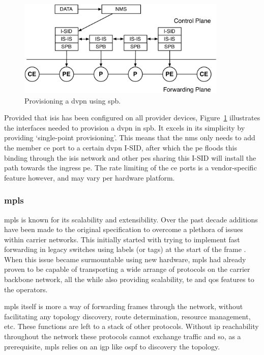 \begin{figure}[!h]
	\centering
	\includegraphics[width=10cm]{./includes/spb-stack.pdf}
	\caption{Provisioning a \ac{dvpn} using \ac{spb}.}
	\label{fig:spb-stack}
\end{figure}

Provided that \ac{isis} has been configured on all provider devices, Figure~\ref{fig:spb-stack} illustrates the interfaces needed to provision a \ac{dvpn} in \ac{spb}. It excels in its simplicity by providing `single-point provisioning'. This means that the \ac{nms} only needs to add the member \ac{ce} port to a certain \ac{dvpn} I-SID, after which the \ac{pe} floods this binding through the \ac{isis} network and other \acp{pe} sharing this I-SID will install the path towards the ingress \ac{pe}. The rate limiting of the \ac{ce} ports is a vendor-specific feature however, and may vary per hardware platform.



\subsubsection{\acs{mpls}} %
\label{ssub:mpls}

\ac{mpls} is known for its scalability and extensibility. Over the past decade additions have been made to the original specification to overcome a plethora of issues within carrier networks. This initially started with trying to implement fast forwarding in legacy switches using labels (or tags) at the start of the frame \cite{tag-switching}. When this issue became surmountable using new hardware, \ac{mpls} had already proven to be capable of transporting a wide arrange of protocols on the carrier backbone network, all the while also providing scalability, \ac{te} and \ac{qos} features to the operators.

\ac{mpls} itself is more a way of forwarding frames through the network, without facilitating any topology discovery, route determination, resource management, etc. These functions are left to a stack of other protocols. Without \ac{ip} reachability throughout the network these protocols cannot exchange traffic and so, as a prerequisite, \ac{mpls} relies on an \ac{igp} like \ac{ospf} to discovery the topology.

